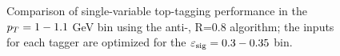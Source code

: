 \begin{figure}
\begin{center}
\caption{Comparison of single-variable top-tagging performance in the $p_T= 1-1.1$ GeV bin using the anti-\kT, R=0.8 algorithm; the inputs for each tagger are optimized for the $\varepsilon_{\rm sig}=0.3-0.35$ bin.}
\label{fig:single_variable_ROC_eps0_35}
\end{center}
\end{figure}

